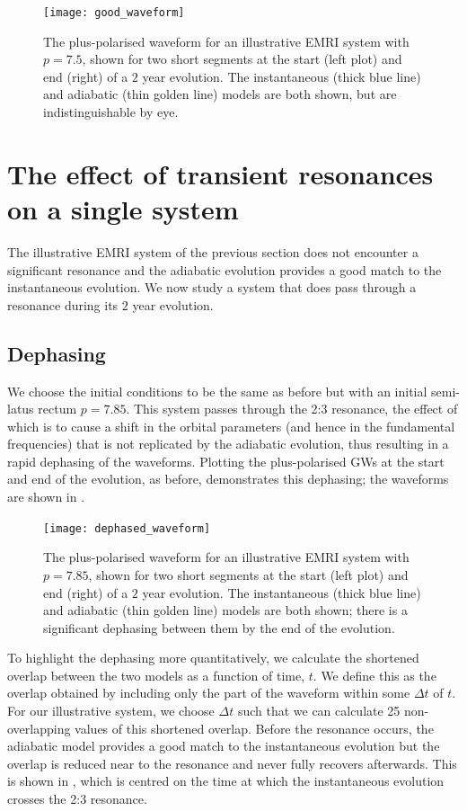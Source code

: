 \begin{figure}[htbp]
\centering
\texttt{[image: good\_waveform]}
\caption{\label{fig:good-waveform}The plus-polarised waveform for an illustrative EMRI system with $p=7.5$, shown for two short segments at the start (left plot) and end (right) of a $2$ year evolution. The instantaneous (thick blue line) and adiabatic (thin golden line) models are both shown, but are indistinguishable by eye.}
\end{figure}

\section{The effect of transient resonances on a single system}
\label{sec:effres-single-system}
The illustrative EMRI system of the previous section does not encounter a significant resonance and the adiabatic evolution provides a good match to the instantaneous evolution. We now study a system that does pass through a resonance during its $2$ year evolution.

\subsection{Dephasing}
\label{sec:effres-dephasing}
We choose the initial conditions to be the same as before but with an initial semi-latus rectum $p=7.85$. This system passes through the 2:3 resonance, the effect of which is to cause a shift in the orbital parameters (and hence in the fundamental frequencies) that is not replicated by the adiabatic evolution, thus resulting in a rapid dephasing of the waveforms. Plotting the plus-polarised GWs at the start and end of the evolution, as before, demonstrates this dephasing; the waveforms are shown in .

\begin{figure}[htbp]
\centering
\texttt{[image: dephased\_waveform]}
\caption{\label{fig:dephased-waveform}The plus-polarised waveform for an illustrative EMRI system with $p=7.85$, shown for two short segments at the start (left plot) and end (right) of a $2$ year evolution. The instantaneous (thick blue line) and adiabatic (thin golden line) models are both shown; there is a significant dephasing between them by the end of the evolution.}
\end{figure}

To highlight the dephasing more quantitatively, we calculate the shortened overlap between the two models as a function of time, $t$. We define this as the overlap obtained by including only the part of the waveform within some $\Delta t$ of $t$. For our illustrative system, we choose $\Delta t$ such that we can calculate 25 non-overlapping values of this shortened overlap. Before the resonance occurs, the adiabatic model provides a good match to the instantaneous evolution but the overlap is reduced near to the resonance and never fully recovers afterwards. This is shown in , which is centred on the time at which the instantaneous evolution crosses the 2:3 resonance.

